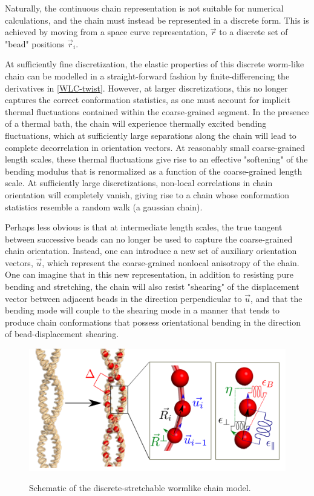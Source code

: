 \documentclass[english]{article}
\begin{document}
Naturally, the continuous chain representation is not suitable for numerical calculations, and the chain must instead be represented in a discrete form. This is achieved by moving from a space curve representation, $\vec{r}$ to a discrete set of "bead" positions $\vec{r}_i$.

At sufficiently fine discretization, the elastic properties of this discrete worm-like chain can be modelled in a straight-forward fashion by finite-differencing the derivatives in \eqref{WLC-twist}. However, at larger discretizations, this no longer captures the correct conformation statistics, as one must account for implicit thermal fluctuations contained within the coarse-grained segment. In the presence of a thermal bath, the chain will experience thermally excited bending fluctuations, which at sufficiently large separations along the chain will lead to complete decorrelation in orientation vectors. At reasonably small coarse-grained length scales, these thermal fluctuations give rise to an effective "softening" of the bending modulus that is renormalized as a function of the coarse-grained length scale. At sufficiently large discretizations, non-local correlations in chain orientation will completely vanish, giving rise to a chain whose conformation statistics resemble a random walk (a gaussian chain).   

Perhaps less obvious is that at intermediate length scales, the true tangent between successive beads can no longer be used to capture the coarse-grained chain orientation. Instead, one can introduce a new set of auxiliary orientation vectors, $\vec{u}$, which represent the coarse-grained nonlocal anisotropy of the chain. One can imagine that in this new representation, in addition to resisting pure bending and stretching, the chain will also resist "shearing" of the displacement vector between adjacent beads in the direction perpendicular to $\vec{u}$, and that the bending mode will couple to the shearing mode in a manner that tends to produce chain conformations that possess orientational bending in the direction of bead-displacement shearing.

\begin{figure}
\centering

\includegraphics[scale=0.25]{figures/dssWLC.png}
\label{figure1}
\caption{Schematic of the discrete-stretchable wormlike chain model.}
\end{figure}
\end{document}
